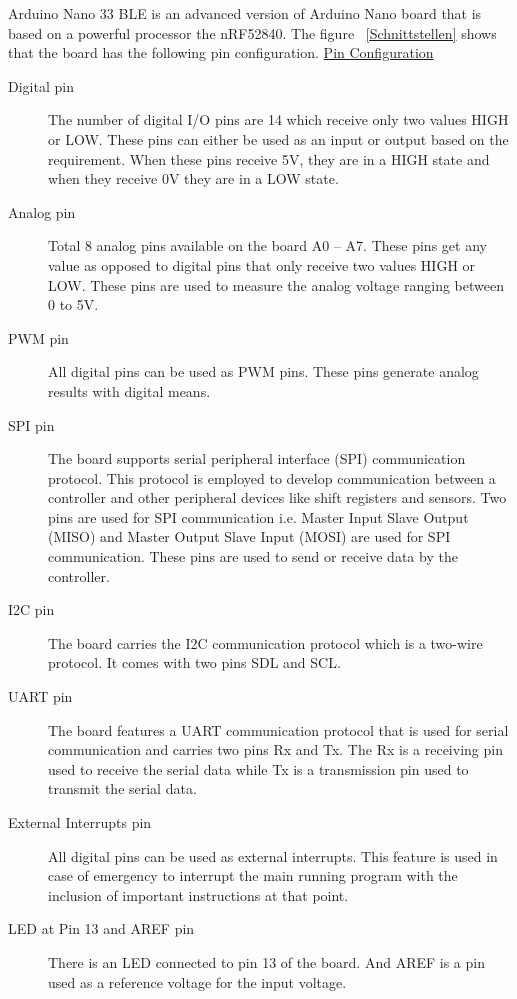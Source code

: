 Arduino Nano 33 BLE is an advanced version of Arduino Nano board that is based on a powerful processor the nRF52840. The figure ~\ref{Schnittstellen} shows that the board has the following pin configuration. \href{https://www.etechnophiles.com/arduino-nano-33-ble-sense-pinout-introduction-specifications/}{Pin Configuration}


\begin{description}
  \item[Digital pin] The number of digital I/O pins are 14 which receive only two values HIGH or LOW. These pins can either be used as an input or output based on the requirement. When these pins receive 5V, they are in a HIGH state and when they receive 0V they are in a LOW state.
  \item[Analog pin] Total 8 analog pins available on the board A0 -- A7. These pins get any value as opposed to digital pins that only receive two values HIGH or LOW. These pins are used to measure the analog voltage ranging between 0 to 5V.
  \item[PWM pin] All digital pins can be used as PWM pins. These pins generate analog results with digital means.
  \item[SPI pin] The board supports serial peripheral interface (SPI) communication protocol. This protocol is employed to develop communication between a controller and other peripheral devices like shift registers and sensors. Two pins are used for SPI communication i.e. Master Input Slave Output (MISO) and Master Output Slave Input (MOSI) are used for SPI communication. These pins are used to send or receive data by the controller.
  \item[I2C pin] The board carries the I2C communication protocol which is a two-wire protocol. It comes with two pins SDL and SCL.
  \item[UART pin] The board features a UART communication protocol that is used for serial communication and carries two pins Rx and Tx. The Rx is a receiving pin used to receive the serial data while Tx is a transmission pin used to transmit the serial data.
  \item[External Interrupts pin] All digital pins can be used as external interrupts. This feature is used in case of emergency to interrupt the main running program with the inclusion of important instructions at that point.
  \item[LED at Pin 13 and AREF pin] There is an LED connected to pin 13 of the board. And AREF is a pin used as a reference voltage for the input voltage.
\end{description}



